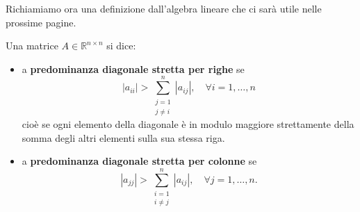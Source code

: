 Richiamiamo ora una definizione dall'algebra lineare che ci sarà utile nelle prossime pagine.
\begin{definition}
  Una matrice $A\in \mathbb{R} ^{n\times n} $ si dice:
  \begin{itemize}
      \item a \textbf{predominanza diagonale stretta per righe} se
      \begin{equation*}
          |a_{ii} | >\sum ^{n}_{\substack{j=1\\j\neq i}} |a_{ij} |,\quad \forall i=1,\dotsc ,n
      \end{equation*}
      cioè se ogni elemento della diagonale è in modulo maggiore strettamente della somma degli altri elementi sulla sua stessa riga.
      \item a \textbf{predominanza diagonale stretta per colonne} se
      \begin{equation*}
          |a_{jj} | >\sum ^{n}_{\substack{i=1\\i\neq j}} |a_{ij} |,\quad \forall j=1,\dotsc ,n.
      \end{equation*}
  \end{itemize}
\end{definition}

